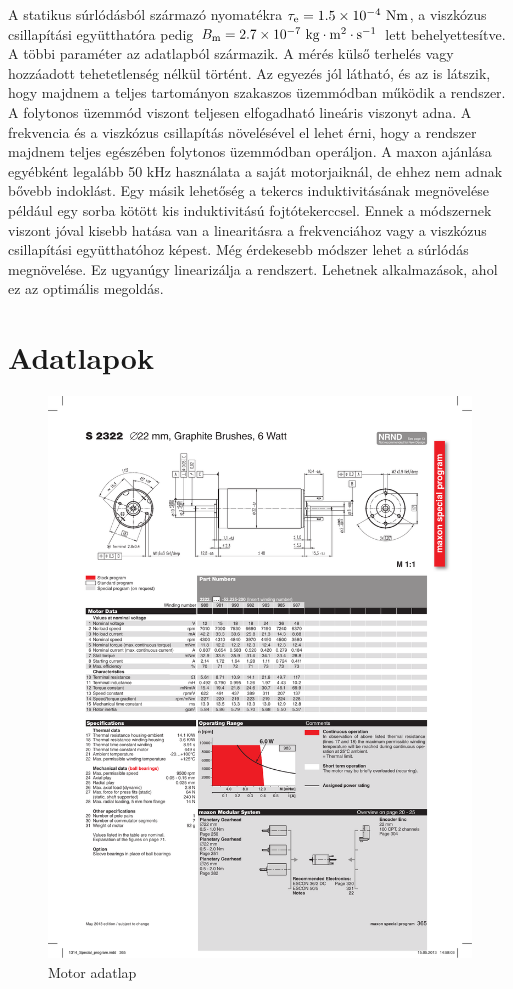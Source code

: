 A statikus súrlódásból származó nyomatékra \(\tau_{\mathrm{e}} = 1.5 \times 10^{-4}~\mathrm{Nm}\), a viszkózus csillapítási együtthatóra pedig 
\(B_{\mathrm{m}} = 2.7 \times 10^{-7}~\mathrm{kg \cdot m^2 \cdot s^{-1}}\) lett behelyettesítve. A többi paraméter az adatlapból származik. 
A mérés külső terhelés vagy hozzáadott tehetetlenség nélkül történt. Az egyezés jól látható, és az is látszik, hogy majdnem a 
teljes tartományon szakaszos üzemmódban működik a rendszer. A folytonos üzemmód viszont teljesen elfogadható 
lineáris viszonyt adna. A frekvencia és a viszkózus csillapítás növelésével el lehet érni, hogy a rendszer majdnem teljes 
egészében folytonos üzemmódban operáljon. A maxon ajánlása egyébként legalább 50 kHz használata a saját motorjaiknál, 
de ehhez nem adnak bővebb indoklást. Egy másik lehetőség a tekercs induktivitásának megnövelése például egy sorba kötött kis 
induktivitású fojtótekerccsel. Ennek a módszernek viszont jóval kisebb hatása van a linearitásra a frekvenciához vagy a 
viszkózus csillapítási együtthatóhoz képest. Még érdekesebb módszer lehet a súrlódás megnövelése. Ez ugyanúgy linearizálja a rendszert. 
Lehetnek alkalmazások, ahol ez az optimális megoldás. 

\chapter{Adatlapok}
\begin{figure}[H]
    \begin{center}
    \includegraphics[width=\textwidth]{images/motor.pdf}
    \caption{Motor adatlap}\label{fig:motor_datasheet}
    \end{center}
\end{figure}

